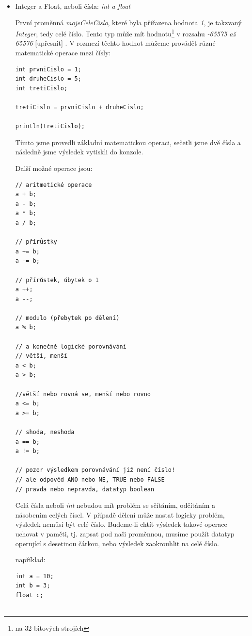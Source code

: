 \documentclass[11pt]{article}
\begin{document}
\begin{itemize}


\item{Integer a Float, neboli čísla: {\em int a float}}

První proměnná {\em mojeCeleCislo}, které byla přiřazena hodnota {\em 1}, je takzvaný {\em Integer}, tedy celé číslo. Tento typ může mít hodnotu\footnote{na 32-bitových strojích} v rozsahu {\em -65575 až 65576} [upřesnit] . V rozmezí těchto hodnot můžeme provádět různé matematické operace mezi čísly:

\begin{lstlisting}
int prvniCislo = 1;
int druheCislo = 5;
int tretiCislo;

tretiCislo = prvniCislo + druheCislo;

println(tretiCislo);
\end{lstlisting}

Tímto jsme provedli základní matematickou operaci, sečetli jsme dvě čísla a následně jsme výsledek vytiskli do konzole.

Další možné operace jsou:

\begin{lstlisting}
// aritmetické operace
a + b;
a - b;
a * b;
a / b;

// přírůstky
a += b;
a -= b;

// přírůstek, úbytek o 1
a ++;
a --;

// modulo (přebytek po dělení)
a % b;

// a konečně logické porovnávání
// větší, menší
a < b;
a > b;

//větší nebo rovná se, menší nebo rovno
a <= b;
a >= b;

// shoda, neshoda
a == b;
a != b;

// pozor výsledkem porovnávání již není číslo!
// ale odpověd ANO nebo NE, TRUE nebo FALSE
// pravda nebo nepravda, datatyp boolean

\end{lstlisting}

Celá čísla neboli {\em int} nebudou mít problém se sčítáním, odčítáním a násobením celých čísel. V případě dělení může nastat logicky problém, výsledek nemůsí být celé číslo. Budeme-li chtít výsledek takové operace uchovat v paměti, tj. zapsat pod naši proměnnou, musíme použít datatyp operující s desetinou čárkou, nebo výsledek zaokrouhlit na celé číslo.

například:

\begin{lstlisting}
int a = 10;
int b = 3;
float c;


\end{lstlisting}
\end{itemize}
\end{document}
